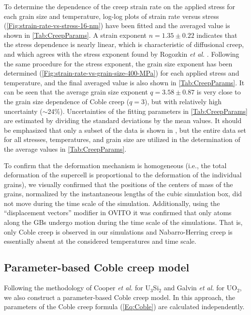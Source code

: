 \documentclass[preprint,12pt,sort&compress]{elsarticle}
\newcommand{\?}{\stackrel{?}{=}}
\begin{document}
To determine the dependence of the creep strain rate on the applied stress for each grain size and temperature, log-log plots of strain rate versus stress (\cref{Fig:strain-rate-vs-stress-16-nm}) have been fitted and the averaged value is shown in \cref{Tab:CreepParams}. A strain exponent $n = 1.35 \pm 0.22$ indicates that the stress dependence is nearly linear, which is characteristic of diffusional creep, and which agrees with the stress exponent found by Rogozkin \textit{et al.} \cite{Rogozkin2003}. Following the same procedure for the stress exponent, the grain size exponent has been determined (\cref{Fig:strain-rate-vs-grain-size-400-MPa}) for each applied stress and temperature, and the final averaged value is also shown in \cref{Tab:CreepParams}. It can be seen that the average grain size exponent $q = 3.58 \pm 0.87$ is very close to the grain size dependence of Coble creep ($q = 3$), but with relatively high uncertainty ($\sim$24\%). Uncertainties of the fitting parameters in \cref{Tab:CreepParams} are estimated by dividing the standard deviations by the mean values. It should be emphasized that only a subset of the data is shown in , but the entire data set for all stresses, temperatures, and grain size are utilized in the determination of the average values in \cref{Tab:CreepParams}.

To confirm that the deformation mechanism is homogeneous (i.e., the total deformation of the supercell is proportional to the deformation of the individual grains), we visually confirmed that the positions of the centers of mass of the grains, normalized by the instantaneous lengths of the cubic simulation box, did not move during the time scale of the simulation. Additionally, using the ``displacement vectors'' modifier in OVITO \cite{Stukowski2010} it was confirmed that only atoms along the GBs undergo motion during the time scale of the simulations. That is, only Coble creep is observed in our simulations and Nabarro-Herring creep is essentially absent at the considered temperatures and time scale.

\subsection{Parameter-based Coble creep model}
\label{Sec:ParameterBased}

Following the methodology of Cooper \textit{et al.} \cite{Cooper2021} for U$_3$Si$_2$ and Galvin \textit{et al.} \cite{Galvin2025} for UO$_2$, we also construct a parameter-based Coble creep model. In this approach, the parameters of the Coble creep formula (\cref{Eq:Coble}) are calculated independently. 
\end{document}

